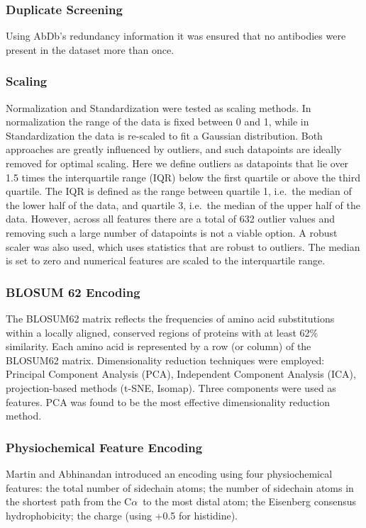 \documentclass[12pt]{article}
\newcommand{\ca}{\mbox{C$\alpha$}}
\let\shortcite\cite
\begin{document}
\subsubsection{Duplicate Screening}
Using AbDb's redundancy information it was ensured that no antibodies
were present in the dataset more than once.

\subsubsection{Scaling}
Normalization and Standardization were tested as scaling methods. In normalization the range of the data is fixed between 0 and 1, while in Standardization the data is re-scaled to fit a Gaussian distribution. Both
approaches are greatly influenced by outliers, and such datapoints are
ideally removed for optimal scaling. Here we define outliers as
datapoints that lie over 1.5 times the interquartile range (IQR) below
the first quartile or above the third quartile. The IQR is defined as
the range between quartile 1, i.e.\ the median of the lower half of the
data, and quartile 3, i.e.\ the median of the upper half of the
data. However, across all features there are a total of 632 outlier
values and removing such a large number of datapoints is not a viable
option. A robust scaler\cite{XXXX} was also used, which uses statistics that are
robust to outliers. The median is set to zero and numerical features
are scaled to the interquartile range.

\subsubsection{BLOSUM 62 Encoding}
The BLOSUM62 matrix reflects the frequencies of amino acid
substitutions within a locally aligned, conserved regions of proteins
with at least 62\% similarity. Each amino acid is represented by a row
(or column) of the BLOSUM62 matrix. Dimensionality reduction
techniques were employed: Principal Component Analysis (PCA),
Independent Component Analysis (ICA), projection-based methods (t-SNE,
Isomap). Three components were used as features. PCA was found to be the most effective dimensionality reduction method. 

\subsubsection{Physiochemical Feature Encoding}
Martin and Abhinandan\shortcite{Abhinandan2010} introduced an encoding using
four physiochemical features:
the total number of sidechain atoms; the
number of sidechain atoms in the shortest path from the \ca\ to the most
distal atom; the Eisenberg consensus
hydrophobicity\cite{Eisenberg1982}; the charge (using +0.5 for histidine).
\end{document}
